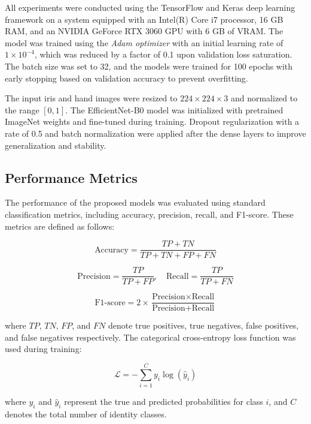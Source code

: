 \documentclass[12pt,a4paper]{report}
\begin{document}
All experiments were conducted using the TensorFlow and Keras deep learning framework on a system equipped with an Intel(R) Core i7 processor, 16 GB RAM, and an NVIDIA GeForce RTX 3060 GPU with 6 GB of VRAM. The model was trained using the \textit{Adam optimizer} with an initial learning rate of \(1 \times 10^{-4}\), which was reduced by a factor of 0.1 upon validation loss saturation. The batch size was set to 32, and the models were trained for 100 epochs with early stopping based on validation accuracy to prevent overfitting.  

The input iris and hand images were resized to \(224 \times 224 \times 3\) and normalized to the range \([0, 1]\). The EfficientNet-B0 model was initialized with pretrained ImageNet weights and fine-tuned during training. Dropout regularization with a rate of 0.5 and batch normalization were applied after the dense layers to improve generalization and stability.

\subsection{Performance Metrics}

The performance of the proposed models was evaluated using standard classification metrics, including accuracy, precision, recall, and F1-score. These metrics are defined as follows:

\begin{equation}
\text{Accuracy} = \frac{TP + TN}{TP + TN + FP + FN}
\end{equation}

\begin{equation}
\text{Precision} = \frac{TP}{TP + FP}, \quad
\text{Recall} = \frac{TP}{TP + FN}
\end{equation}

\begin{equation}
\text{F1-score} = 2 \times \frac{\text{Precision} \times \text{Recall}}{\text{Precision} + \text{Recall}}
\end{equation}

where \( TP \), \( TN \), \( FP \), and \( FN \) denote true positives, true negatives, false positives, and false negatives respectively. The categorical cross-entropy loss function was used during training:

\begin{equation}
\mathcal{L} = -\sum_{i=1}^{C} y_i \log(\hat{y}_i)
\end{equation}

where \( y_i \) and \( \hat{y}_i \) represent the true and predicted probabilities for class \( i \), and \( C \) denotes the total number of identity classes.
\end{document}
